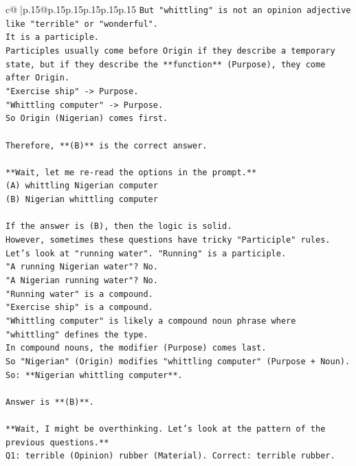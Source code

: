 \documentclass{article}
\begin{document}
{\begin{supertabular}{c@{$\;$}|p{.15\linewidth}@{}p{.15\linewidth}p{.15\linewidth}p{.15\linewidth}p{.15\linewidth}p{.15\linewidth}}
{{{\texttt{But "whittling" is not an opinion adjective like "terrible" or "wonderful".} \\
\texttt{It is a participle.} \\
\texttt{Participles usually come before Origin if they describe a temporary state, but if they describe the **function** (Purpose), they come after Origin.} \\
\texttt{"Exercise ship" {-}> Purpose.} \\
\texttt{"Whittling computer" {-}> Purpose.} \\
\texttt{So Origin (Nigerian) comes first.} \\
\\ 
\texttt{Therefore, **(B)** is the correct answer.} \\
\\ 
\texttt{**Wait, let me re{-}read the options in the prompt.**} \\
\texttt{(A) whittling Nigerian computer} \\
\texttt{(B) Nigerian whittling computer} \\
\\ 
\texttt{If the answer is (B), then the logic is solid.} \\
\texttt{However, sometimes these questions have tricky "Participle" rules.} \\
\texttt{Let's look at "running water". "Running" is a participle.} \\
\texttt{"A running Nigerian water"? No.} \\
\texttt{"A Nigerian running water"? No.} \\
\texttt{"Running water" is a compound.} \\
\texttt{"Exercise ship" is a compound.} \\
\texttt{"Whittling computer" is likely a compound noun phrase where "whittling" defines the type.} \\
\texttt{In compound nouns, the modifier (Purpose) comes last.} \\
\texttt{So "Nigerian" (Origin) modifies "whittling computer" (Purpose + Noun).} \\
\texttt{So: **Nigerian whittling computer**.} \\
\\ 
\texttt{Answer is **(B)**.} \\
\\ 
\texttt{**Wait, I might be overthinking. Let's look at the pattern of the previous questions.**} \\
\texttt{Q1: terrible (Opinion) rubber (Material). Correct: terrible rubber.} \\
}}}
\end{supertabular}}
\end{document}
